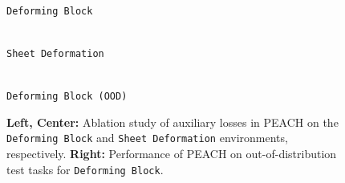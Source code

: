 \begin{figure}[t]
    \makebox[\textwidth][c]{
        
    }
  \centering
     \begin{minipage}{0.32\textwidth}
        \scalebox{0.6}{}\\
        {\small \hspace*{18mm} \texttt{Deforming Block}}
     \end{minipage}
     \hspace{4mm}
     \begin{minipage}{0.32\textwidth}
        \scalebox{0.6}{}\\
        {\small \hspace*{8mm}\texttt{Sheet Deformation}}
     \end{minipage}
     \hspace{-4mm}
    \begin{minipage}{0.32\textwidth}
        \centering
        \scalebox{0.6}{}\\
        {\small \hspace*{4mm}\texttt{Deforming Block (OOD)}}
        
    \end{minipage}
  \caption{  \textbf{Left, Center:} Ablation study of auxiliary losses in PEACH on the
  \texttt{Deforming Block} and \texttt{Sheet Deformation} environments, respectively.
  \textbf{Right:} Performance of PEACH on out-of-distribution test tasks for
  \texttt{Deforming Block}.}
  \vspace{-0.4cm}
  \label{fig:generalizations_ablations}
\end{figure}

